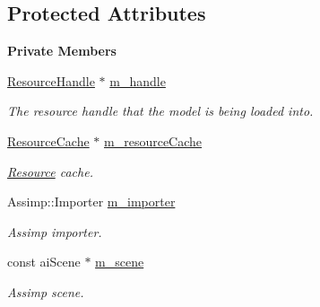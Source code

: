 \subsection*{Protected Attributes}
\begin{Indent}\textbf{ Private Members}\par
\begin{DoxyCompactItemize}
\item 
\mbox{\label{classrev_1_1_model_reader_ab43f5a2a8fbf6ae597c05b52157c9601}} 
\mbox{\hyperlink{classrev_1_1_resource_handle}{Resource\+Handle}} $\ast$ \mbox{\hyperlink{classrev_1_1_model_reader_ab43f5a2a8fbf6ae597c05b52157c9601}{m\+\_\+handle}}
\begin{DoxyCompactList}\small\item\em The resource handle that the model is being loaded into. \end{DoxyCompactList}\item 
\mbox{\label{classrev_1_1_model_reader_aff32e608229fc3466b5244cec4bd6f0b}} 
\mbox{\hyperlink{classrev_1_1_resource_cache}{Resource\+Cache}} $\ast$ \mbox{\hyperlink{classrev_1_1_model_reader_aff32e608229fc3466b5244cec4bd6f0b}{m\+\_\+resource\+Cache}}
\begin{DoxyCompactList}\small\item\em \mbox{\hyperlink{classrev_1_1_resource}{Resource}} cache. \end{DoxyCompactList}\item 
\mbox{\label{classrev_1_1_model_reader_a2c0ec311c6138e5072a5b03c393c05e2}} 
Assimp\+::\+Importer \mbox{\hyperlink{classrev_1_1_model_reader_a2c0ec311c6138e5072a5b03c393c05e2}{m\+\_\+importer}}
\begin{DoxyCompactList}\small\item\em Assimp importer. \end{DoxyCompactList}\item 
\mbox{\label{classrev_1_1_model_reader_ae6146196c488156d9141c80e36ef882f}} 
const ai\+Scene $\ast$ \mbox{\hyperlink{classrev_1_1_model_reader_ae6146196c488156d9141c80e36ef882f}{m\+\_\+scene}}
\begin{DoxyCompactList}\small\item\em Assimp scene. \end{DoxyCompactList}\item 

\end{DoxyCompactItemize}
\end{Indent}
